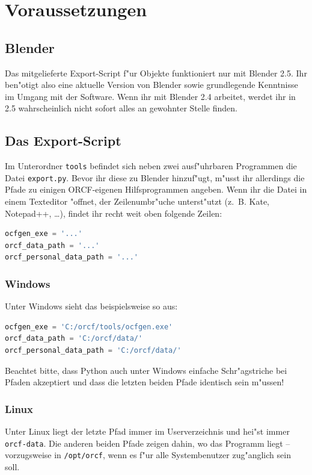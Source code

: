 \documentclass[a4paper]{article}
\newcommand{\cfile}[1]{\texttt{#1}}
\begin{document}
\section{Voraussetzungen}

\subsection{Blender}
Das mitgelieferte Export-Script f"ur Objekte funktioniert nur mit Blender 2.5. Ihr ben"otigt also eine aktuelle Version von Blender sowie grundlegende
Kenntnisse im Umgang mit der Software. Wenn ihr mit Blender 2.4 arbeitet, werdet ihr in 2.5 wahrscheinlich nicht sofort alles an gewohnter Stelle
finden.

\subsection{Das Export-Script}
Im Unterordner \cfile{tools} befindet sich neben zwei ausf"uhrbaren Programmen die Datei \cfile{export.py}. Bevor ihr diese zu Blender hinzuf"ugt,
m"usst ihr allerdings die Pfade zu einigen ORCF-eigenen Hilfsprogrammen angeben. Wenn ihr die Datei in einem Texteditor "offnet, der Zeilenumbr"uche
unterst"utzt (z.\, B. Kate, Notepad++, \dots ), findet ihr recht weit oben folgende Zeilen:
\begin{lstlisting}[language=python]
ocfgen_exe = '...'
orcf_data_path = '...'
orcf_personal_data_path = '...'
\end{lstlisting}

\subsubsection{Windows}
Unter Windows sieht das beispielsweise so aus:
\begin{lstlisting}[language=python]
ocfgen_exe = 'C:/orcf/tools/ocfgen.exe'
orcf_data_path = 'C:/orcf/data/'
orcf_personal_data_path = 'C:/orcf/data/'
\end{lstlisting}

Beachtet bitte, dass Python auch unter Windows einfache Schr"agstriche bei Pfaden akzeptiert und dass die letzten beiden Pfade identisch sein m"ussen!

\subsubsection{Linux}
Unter Linux liegt der letzte Pfad immer im Userverzeichnis und hei"st immer \cfile{orcf-data}. Die
anderen beiden Pfade zeigen dahin, wo das Programm liegt -- vorzugsweise in \cfile{/opt/orcf}, wenn es f"ur alle Systembenutzer zug"anglich sein soll.
\end{document}
